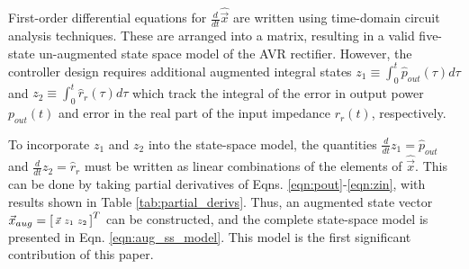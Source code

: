 \documentclass[conference, twocolumn, letterpaper]{IEEEtran}
\begin{document}
First-order differential equations for $\frac{d}{dt}\hat{\vec{x}}$ are written using time-domain circuit analysis techniques. These are arranged into a matrix, resulting in a valid five-state un-augmented state space model of the AVR rectifier. However, the controller design requires additional augmented integral states $z_1 \equiv \int_0^t \hat{p}_{out}(\tau) d\tau$ and $z_2 \equiv \int_0^t \hat{r}_r(\tau) d\tau$ which track the integral of the error in output power $p_{out}(t)$ and error in the real part of the input impedance $r_r(t)$, respectively. 

To incorporate $z_1$ and $z_2$ into the state-space model, the quantities $\frac{d}{dt}z_1 = \hat{p}_{out}$ and $\frac{d}{dt}z_2 = \hat{r}_r$ must be written as linear combinations of the elements of $\hat{\vec{x}}$. This can be done by taking partial derivatives of Eqns. \ref{eqn:pout}-\ref{eqn:zin}, with results shown in Table \ref{tab:partial_derivs}. Thus, an augmented state vector $\vec{x}_{aug} = \begin{bsmallmatrix} \vec{x} & z_1 & z_2 \end{bsmallmatrix}^T$ can be constructed, and the complete state-space model is presented in Eqn. \ref{eqn:aug_ss_model}. This model is the first significant contribution of this paper.
\end{document}
